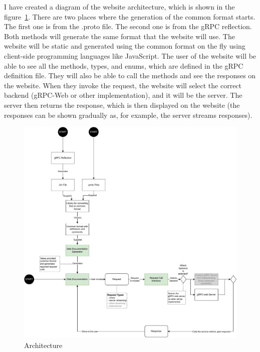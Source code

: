 I have created a diagram of the website architecture, which is shown in the figure~\ref{fig:grpcflair-architecture}.
There are two places where the generation of the common format starts.
The first one is from the .proto file.
The second one is from the gRPC reflection.
Both methods will generate the same format that the website will use.
The website will be static and generated using the common format on the fly using client-side programming languages like JavaScript.
The user of the website will be able to see all the methods, types, and enums, which are defined in the gRPC definition file.
They will also be able to call the methods and see the responses on the website.
When they invoke the request, the website will select the correct backend (gRPC-Web or other implementation), and it will be the server.
The server then returns the response, which is then displayed on the website (the responses can be shown gradually as, for example, the server streams responses).


\begin{figure}[hbt!]
    \centering
    \captionsetup{justification=centering}
    \includegraphics[width=1.0\textwidth]{images/design/grpcdoc-architecture}
    \caption{Architecture}
    \label{fig:grpcflair-architecture}
\end{figure}

